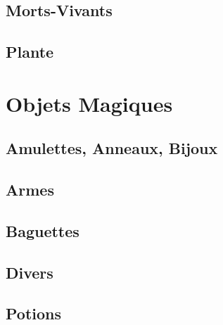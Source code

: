 \documentclass{dd}
\begin{document}
\section{Morts-Vivants}









\section{Plante}


\chapter{Objets Magiques}

\section{Amulettes, Anneaux, Bijoux} \label{OMbijoux}




\section{Armes} \label{OMarmes}



\section{Baguettes} \label{OMbaguettes}


\section{Divers} \label{OMdivers}




\section{Potions} \label{potions}
\end{document}
